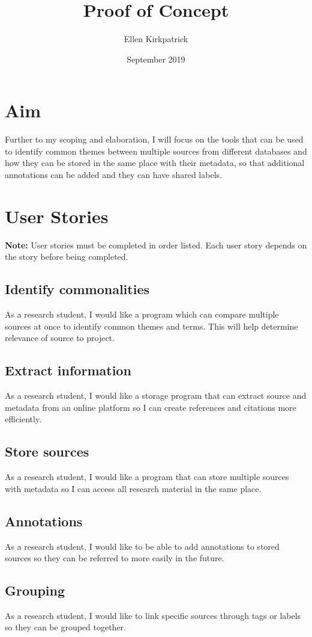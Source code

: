 \documentclass{article}
\title{Proof of Concept}
\author{Ellen Kirkpatrick }
\date{September 2019}
\begin{document}
\maketitle

\section{Aim}
Further to my scoping and elaboration, I will focus on the tools that can be used to identify common themes between multiple sources from different databases and how they can be stored in the same place with their metadata, so that additional annotations can be added and they can have shared labels.

\section{User Stories}
\textbf{Note:} User stories must be completed in order listed. Each user story depends on the story before being completed. 
\subsection{Identify commonalities}
As a research student, I would like a program which can compare multiple sources at once to identify common themes and terms. This will help determine relevance of source to project.
\subsection{Extract information}
As a research student, I would like a storage program that can extract source and metadata from an online platform so I can create references and citations more efficiently.
\subsection{Store sources}
As a research student, I would like a program that can store multiple sources with metadata so I can access all research material in the same place. 
\subsection{Annotations}
As a research student, I would like to be able to add annotations to stored sources so they can be referred to more easily in the future.
\subsection{Grouping}
As a research student, I would like to link specific sources through tags or labels so they can be grouped together. 
\end{document}
